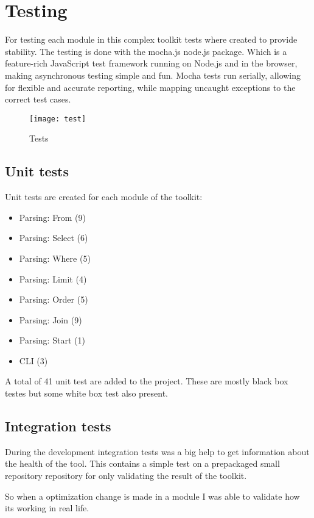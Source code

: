 \section{Testing}

For testing each module in this complex toolkit tests where created to provide stability. The testing is done with the mocha.js\cite{mocha} node.js package. Which is a feature-rich JavaScript test framework running on Node.js and in the browser, making asynchronous testing simple and fun. Mocha tests run serially, allowing for flexible and accurate reporting, while mapping uncaught exceptions to the correct test cases.

\begin{figure}[H]
	\centering
	\texttt{[image: test]}
	\caption{Tests}
	\label{fig:fig-help}
\end{figure}

\subsection{Unit tests}

Unit tests are created for each module of the toolkit:

\begin{itemize}
	\item Parsing: From (9)
	\item Parsing: Select (6)
	\item Parsing: Where (5)
	\item Parsing: Limit (4)
	\item Parsing: Order (5)
	\item Parsing: Join (9)
	\item Parsing: Start (1)
	\item CLI (3)
\end{itemize}

A total of 41 unit test are added to the project. These are mostly black box testes but some white box test also present.

\subsection{Integration tests}

During the development integration tests was a big help to get information about the health of the tool. This contains a simple test on a prepackaged small repository repository for only validating the result of the toolkit.

So when a optimization change is made in a module I was able to validate how its working in real life.

